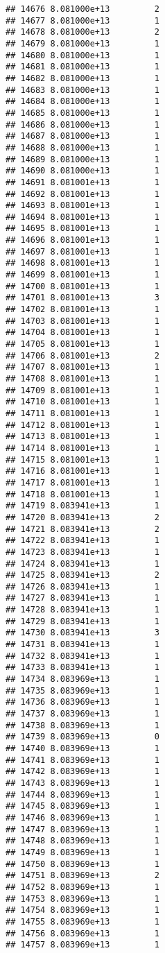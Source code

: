 \documentclass[
]{article}
\begin{document}
\begin{verbatim}
## 14676 8.081000e+13         2
## 14677 8.081000e+13         1
## 14678 8.081000e+13         2
## 14679 8.081000e+13         1
## 14680 8.081000e+13         1
## 14681 8.081000e+13         1
## 14682 8.081000e+13         1
## 14683 8.081000e+13         1
## 14684 8.081000e+13         1
## 14685 8.081000e+13         1
## 14686 8.081000e+13         1
## 14687 8.081000e+13         1
## 14688 8.081000e+13         1
## 14689 8.081000e+13         1
## 14690 8.081000e+13         1
## 14691 8.081001e+13         1
## 14692 8.081001e+13         1
## 14693 8.081001e+13         1
## 14694 8.081001e+13         1
## 14695 8.081001e+13         1
## 14696 8.081001e+13         1
## 14697 8.081001e+13         1
## 14698 8.081001e+13         1
## 14699 8.081001e+13         1
## 14700 8.081001e+13         1
## 14701 8.081001e+13         3
## 14702 8.081001e+13         1
## 14703 8.081001e+13         1
## 14704 8.081001e+13         1
## 14705 8.081001e+13         1
## 14706 8.081001e+13         2
## 14707 8.081001e+13         1
## 14708 8.081001e+13         1
## 14709 8.081001e+13         1
## 14710 8.081001e+13         1
## 14711 8.081001e+13         1
## 14712 8.081001e+13         1
## 14713 8.081001e+13         1
## 14714 8.081001e+13         1
## 14715 8.081001e+13         1
## 14716 8.081001e+13         1
## 14717 8.081001e+13         1
## 14718 8.081001e+13         1
## 14719 8.083941e+13         1
## 14720 8.083941e+13         2
## 14721 8.083941e+13         2
## 14722 8.083941e+13         1
## 14723 8.083941e+13         1
## 14724 8.083941e+13         1
## 14725 8.083941e+13         2
## 14726 8.083941e+13         1
## 14727 8.083941e+13         1
## 14728 8.083941e+13         1
## 14729 8.083941e+13         1
## 14730 8.083941e+13         3
## 14731 8.083941e+13         1
## 14732 8.083941e+13         1
## 14733 8.083941e+13         1
## 14734 8.083969e+13         1
## 14735 8.083969e+13         1
## 14736 8.083969e+13         1
## 14737 8.083969e+13         1
## 14738 8.083969e+13         1
## 14739 8.083969e+13         0
## 14740 8.083969e+13         1
## 14741 8.083969e+13         1
## 14742 8.083969e+13         1
## 14743 8.083969e+13         1
## 14744 8.083969e+13         1
## 14745 8.083969e+13         1
## 14746 8.083969e+13         1
## 14747 8.083969e+13         1
## 14748 8.083969e+13         1
## 14749 8.083969e+13         1
## 14750 8.083969e+13         1
## 14751 8.083969e+13         2
## 14752 8.083969e+13         1
## 14753 8.083969e+13         1
## 14754 8.083969e+13         1
## 14755 8.083969e+13         1
## 14756 8.083969e+13         1
## 14757 8.083969e+13         1

\end{verbatim}
\end{document}
